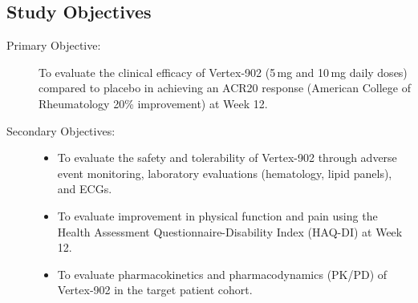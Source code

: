 \subsection{Study Objectives}
\begin{description}
    \item[Primary Objective:] To evaluate the clinical efficacy of Vertex-902 (5\,mg and 10\,mg daily doses) compared to placebo in achieving an ACR20 response (American College of Rheumatology 20\% improvement) at Week 12.
    \item[Secondary Objectives:] 
    \begin{itemize}
        \item To evaluate the safety and tolerability of Vertex-902 through adverse event monitoring, laboratory evaluations (hematology, lipid panels), and ECGs.
        \item To evaluate improvement in physical function and pain using the Health Assessment Questionnaire-Disability Index (HAQ-DI) at Week 12.
        \item To evaluate pharmacokinetics and pharmacodynamics (PK/PD) of Vertex-902 in the target patient cohort.
    \end{itemize}
\end{description}
